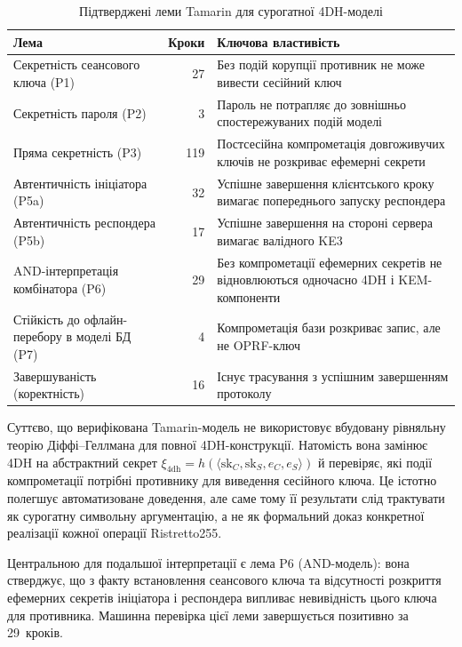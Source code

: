 \documentclass{llncs}
\begin{document}
\begin{table}[htbp]
\caption{Підтверджені леми Tamarin для сурогатної 4DH-моделі}
\label{tab:tamarin-lemmas}
\centering\small
\begin{tabularx}{\textwidth}{@{}L{4.5cm}rX@{}}
\toprule
Лема & Кроки & Ключова властивість \\
\midrule
Секретність сеансового ключа (P1) & 27 & Без подій корупції противник не може вивести сесійний ключ \\
Секретність пароля (P2) & 3 & Пароль не потрапляє до зовнішньо спостережуваних подій моделі \\
Пряма секретність (P3) & 119 & Постсесійна компрометація довгоживучих ключів не розкриває ефемерні секрети \\
Автентичність ініціатора (P5a) & 32 & Успішне завершення клієнтського кроку вимагає попереднього запуску респондера \\
Автентичність респондера (P5b) & 17 & Успішне завершення на стороні сервера вимагає валідного KE3 \\
AND-інтерпретація комбінатора (P6) & 29 & Без компрометації ефемерних секретів не відновлюються одночасно 4DH і KEM-компоненти \\
Стійкість до офлайн-перебору в моделі БД (P7) & 4 & Компрометація бази розкриває запис, але не OPRF-ключ \\
Завершуваність (коректність) & 16 & Існує трасування з успішним завершенням протоколу \\
\bottomrule
\end{tabularx}
\end{table}

Суттєво, що верифікована Tamarin-модель не використовує вбудовану
рівняльну теорію Діффі--Геллмана для повної 4DH-конструкції.
Натомість вона замінює 4DH на абстрактний секрет
$\xi_{\mathrm{4dh}} = h(\langle \mathrm{sk}_C,\mathrm{sk}_S,e_C,e_S\rangle)$ й перевіряє, які події
компрометації потрібні противнику для виведення сесійного ключа. Це
істотно полегшує автоматизоване доведення, але саме
тому її результати слід трактувати як сурогатну символьну аргументацію,
а не як формальний доказ конкретної реалізації кожної операції
Ristretto255.

Центральною для подальшої інтерпретації є лема P6 (AND-модель): вона
стверджує, що з факту встановлення сеансового ключа та відсутності
розкриття ефемерних секретів ініціатора і респондера випливає
невивідність цього ключа для противника. Машинна перевірка цієї леми
завершується позитивно за 29~кроків.
\end{document}
